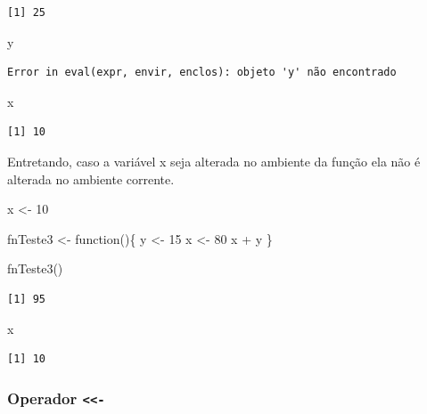 \documentclass[
  letterpaper,
  DIV=11,
  numbers=noendperiod]{scrreprt}
\newenvironment{Shaded}{\begin{snugshade}}{\end{snugshade}}
\newcommand{\ControlFlowTok}[1]{\textcolor[rgb]{0.00,0.23,0.31}{#1}}
\newcommand{\DecValTok}[1]{\textcolor[rgb]{0.68,0.00,0.00}{#1}}
\newcommand{\FunctionTok}[1]{\textcolor[rgb]{0.28,0.35,0.67}{#1}}
\newcommand{\NormalTok}[1]{\textcolor[rgb]{0.00,0.23,0.31}{#1}}
\newcommand{\OtherTok}[1]{\textcolor[rgb]{0.00,0.23,0.31}{#1}}
\newcommand{\SpecialCharTok}[1]{\textcolor[rgb]{0.37,0.37,0.37}{#1}}
\begin{document}
\begin{verbatim}
[1] 25
\end{verbatim}

\begin{Shaded}
\begin{Highlighting}[]
\NormalTok{y}
\end{Highlighting}
\end{Shaded}

\begin{verbatim}
Error in eval(expr, envir, enclos): objeto 'y' não encontrado
\end{verbatim}

\begin{Shaded}
\begin{Highlighting}[]
\NormalTok{x}
\end{Highlighting}
\end{Shaded}

\begin{verbatim}
[1] 10
\end{verbatim}

Entretando, caso a variável x seja alterada no ambiente da função ela
não é alterada no ambiente corrente.

\begin{Shaded}
\begin{Highlighting}[]
\NormalTok{x }\OtherTok{\textless{}{-}} \DecValTok{10}

\NormalTok{fnTeste3 }\OtherTok{\textless{}{-}} \ControlFlowTok{function}\NormalTok{()\{}
\NormalTok{  y }\OtherTok{\textless{}{-}} \DecValTok{15}
\NormalTok{  x }\OtherTok{\textless{}{-}} \DecValTok{80}
\NormalTok{  x }\SpecialCharTok{+}\NormalTok{ y}
\NormalTok{\}}

\FunctionTok{fnTeste3}\NormalTok{()}
\end{Highlighting}
\end{Shaded}

\begin{verbatim}
[1] 95
\end{verbatim}

\begin{Shaded}
\begin{Highlighting}[]
\NormalTok{x}
\end{Highlighting}
\end{Shaded}

\begin{verbatim}
[1] 10
\end{verbatim}

\hypertarget{operador--}{%
\subsubsection{\texorpdfstring{Operador
\texttt{\textless{}\textless{}-}}{Operador \textless\textless-}}\label{operador--}}
\end{document}
